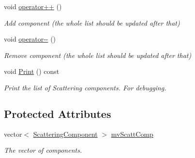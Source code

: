 \begin{DoxyCompactItemize}
void \mbox{\hyperlink{class_obj_cryst_1_1_scattering_component_list_a8524c2bc3633441b2a808b2908ce99ec}{operator++}} ()
\begin{DoxyCompactList}\small\item\em Add component (the whole list should be updated after that) \end{DoxyCompactList}\item 
\mbox{\label{class_obj_cryst_1_1_scattering_component_list_afb399786cc9031db1cbf95df2868831b}} 
void \mbox{\hyperlink{class_obj_cryst_1_1_scattering_component_list_afb399786cc9031db1cbf95df2868831b}{operator-\/-\/}} ()
\begin{DoxyCompactList}\small\item\em Remove component (the whole list should be updated after that) \end{DoxyCompactList}\item 
\mbox{\label{class_obj_cryst_1_1_scattering_component_list_af16db467893abc60b718dcc675d2ec66}} 
void \mbox{\hyperlink{class_obj_cryst_1_1_scattering_component_list_af16db467893abc60b718dcc675d2ec66}{Print}} () const
\begin{DoxyCompactList}\small\item\em Print the list of Scattering components. For debugging. \end{DoxyCompactList}\end{DoxyCompactItemize}
\subsection*{Protected Attributes}
\begin{DoxyCompactItemize}
\item 
\mbox{\label{class_obj_cryst_1_1_scattering_component_list_a191cb4df412bb4294a4e300313e35c3f}} 
vector$<$ \mbox{\hyperlink{struct_obj_cryst_1_1_scattering_component}{Scattering\+Component}} $>$ \mbox{\hyperlink{class_obj_cryst_1_1_scattering_component_list_a191cb4df412bb4294a4e300313e35c3f}{mv\+Scatt\+Comp}}
\begin{DoxyCompactList}\small\item\em The vector of components. \end{DoxyCompactList}\end{DoxyCompactItemize}


